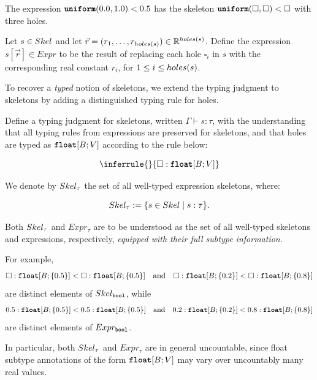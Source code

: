 \begin{example}
	The expression $\textnormal{\ttfamily\bfseries uniform}(0.0, 1.0) < 0.5$ has the skeleton $\textnormal{\ttfamily\bfseries uniform}(\square, \square) < \square$ with three holes. 
\end{example}

\begin{definition}
	Let $s \in Skel$ and let $\vec{r} = (r_1, \ldots, r_{holes(s)}) \in \mathbb{R}^{holes(s)}$. Define the expression $s[\vec{r}] \in Expr$ to be the result of replacing each hole $\square_i$ in $s$ with the corresponding real constant $r_i$, for $1 \le i \le holes(s)$.
\end{definition}

To recover a \emph{typed} notion of skeletons, we extend the typing judgment to
skeletons by adding a distinguished typing rule for holes.

\begin{definition}
	Define a typing judgment for skeletons, written $\Gamma \vdash s : \tau$, with the understanding that all typing rules from expressions are preserved for skeletons, and that holes are typed as $\mathnormal{\textnormal{\ttfamily\bfseries float}}[B; V]$ according to the rule below:

	\[
		\inferrule{ }{\square : \floattype{B}{V}}
	\]

	We denote by $Skel_{\tau}$ the set of all well-typed expression skeletons, where:

	\[
		Skel_{\tau} := \{s \in Skel \mid s : \tau\}.
	\]
\end{definition}

\begin{remark}
	Both $Skel_\tau$ and $Expr_\tau$ are to be understood as the set of all well-typed skeletons and expressions, respectively, \emph{equipped
	with their full subtype information}.

	For example,
	\[
	\square : \mathnormal{\textnormal{\ttfamily\bfseries float}}[B; \{0.5\}] < \square : \mathnormal{\textnormal{\ttfamily\bfseries float}}[B; \{0.5\}]
	\quad\text{and}\quad
	\square : \mathnormal{\textnormal{\ttfamily\bfseries float}}[B; \{0.2\}] < \square : \mathnormal{\textnormal{\ttfamily\bfseries float}}[B; \{0.8\}]
	\]
	are distinct elements of $Skel_{\textnormal{\ttfamily\bfseries bool}}$, while
	\[
	0.5 : \mathnormal{\textnormal{\ttfamily\bfseries float}}[B; \{0.5\}] < 0.5 : \mathnormal{\textnormal{\ttfamily\bfseries float}}[B; \{0.5\}]
	\quad\text{and}\quad
	0.2 : \mathnormal{\textnormal{\ttfamily\bfseries float}}[B; \{0.2\}] < 0.8 : \mathnormal{\textnormal{\ttfamily\bfseries float}}[B; \{0.8\}]
	\]
	are distinct elements of $Expr_{\textnormal{\ttfamily\bfseries bool}}$.

	In particular, both $Skel_\tau$ and $Expr_\tau$ are in general
	uncountable, since float subtype annotations of the form
	$\mathnormal{\textnormal{\ttfamily\bfseries float}}[B; V]$ may vary over uncountably many real values.
\end{remark}

